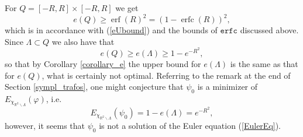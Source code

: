 \documentclass[12pt,a4paper]{article}
\newcommand{\RR}[1]{\mathbb{R}^#1}
\newcommand{\HH}{\mathcal{H}}
\begin{document}
For $Q=[-R,R]\times [-R,R]$ we get
\begin{equation*}
    e(Q) \geq \operatorname{erf}(R)^2 = (1-\operatorname{erfc}(R))^2,
\end{equation*}
which is in accordance with (\ref{eUbound}) and the bounds of $\mathtt{erfc}$
discussed above. Since $\Lambda\subset Q$ we also have that
\begin{displaymath}
  e(Q)\geq e(\Lambda) \geq 1-e^{-R^2}, 
\end{displaymath}
so that by Corollary \ref{corollary_e} the upper bound for $e(\Lambda)$ is the same
as that for $e(Q)$, what is certainly not optimal. Referring to the remark at the
end of Section \ref{sympl_trafos}, one might conjecture that $\psi_0$ is a 
minimizer of $E_{\chi_{\RR{2}\backslash\Lambda}}(\varphi)$, i.e.
\begin{displaymath}
    E_{\chi_{\RR{2}\backslash\Lambda}}(\psi_0)=1-e(\Lambda)=e^{-R^2},
\end{displaymath}    
however, it seems that $\psi_0$ is not a solution of the Euler equation 
(\ref{EulerEq}).
\end{document}
